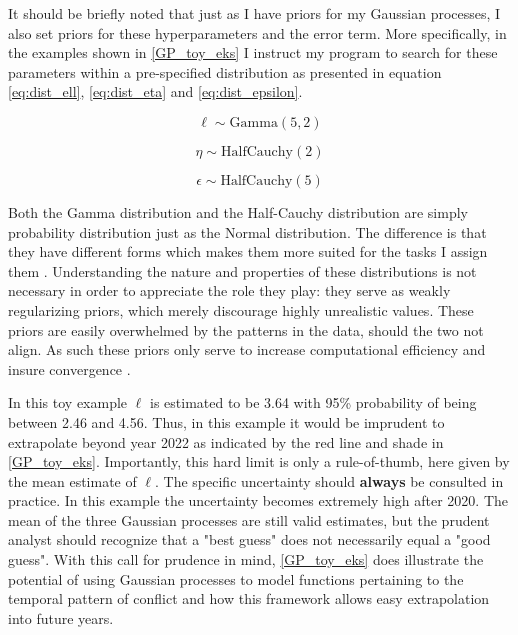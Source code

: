 \documentclass[a4paper]{article}
\begin{document}
It should be briefly noted that just as I have priors for my Gaussian processes, I also set priors for these hyperparameters and the error term. More specifically, in the examples shown in \autoref{GP_toy_eks} I instruct my program to search for these parameters within a pre-specified distribution as presented in equation \ref{eq:dist_ell}, \ref{eq:dist_eta} and \ref{eq:dist_epsilon}.

\[
\ell \sim \text{Gamma}(5,2)  \tag{8}  \label{eq:dist_ell}
\]

\[
\eta \sim \text{HalfCauchy}(2)  \tag{9}  \label{eq:dist_eta}
\]

\[
\epsilon \sim \text{HalfCauchy}(5)  \tag{10}  \label{eq:dist_epsilon}
\]

Both the Gamma distribution and the Half-Cauchy distribution are simply probability distribution just as the Normal distribution. The difference is that they have different forms which makes them more suited for the tasks I assign them \citep[280-285]{Mcelreath_2018}. Understanding the nature and properties of these distributions is not necessary in order to appreciate the role they play: they serve as weakly regularizing priors, which merely discourage highly unrealistic values. These priors are easily overwhelmed by the patterns in the data, should the two not align. As such these priors only serve to increase computational efficiency and insure convergence \citep[35-36]{Mcelreath_2018}.\par 


In this toy example $\ell$ is estimated to be 3.64 with 95\% probability of being between 2.46 and 4.56. Thus, in this example it would be imprudent to extrapolate beyond year 2022 as indicated by the red line and shade in \autoref{GP_toy_eks}. Importantly, this hard limit is only a rule-of-thumb, here given by the mean estimate of $\ell$. The specific uncertainty should \textbf{always} be consulted in practice. In this example the uncertainty becomes extremely high after 2020. The mean of the three Gaussian processes are still valid estimates, but the prudent analyst should recognize that a "best guess" does not necessarily equal a "good guess". With this call for prudence in mind, \autoref{GP_toy_eks} does illustrate the potential of using Gaussian processes to model functions pertaining to the temporal pattern of conflict and how this framework allows easy extrapolation into future years.\par
\end{document}
